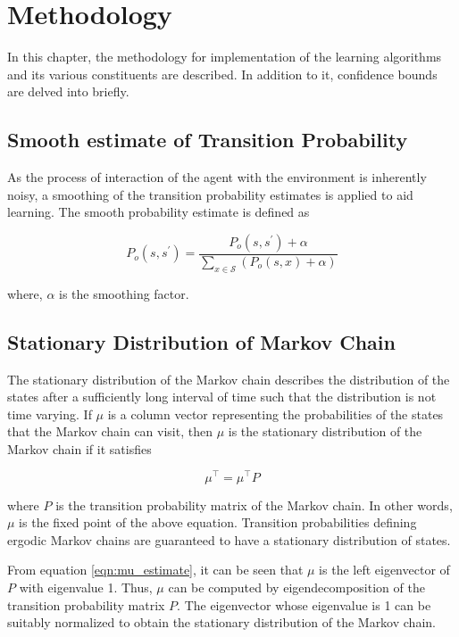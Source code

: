 \chapter{Methodology}

In this chapter, the methodology for implementation of the learning algorithms and its various constituents are described.
In addition to it, confidence bounds are delved into briefly.

\section{Smooth estimate of Transition Probability}

As the process of interaction of the agent with the environment is inherently noisy, a smoothing of the transition probability estimates is applied to aid learning.
The smooth probability estimate is defined as

\begin{equation}
    P_o(s, s^\prime) = \frac{P_o(s, s^\prime) + \alpha}{\sum_{x \in \mathcal{S}} \left(P_o(s, x) + \alpha \right)}
\end{equation}

where, $\alpha$ is the smoothing factor.

\section{Stationary Distribution of Markov Chain}

The stationary distribution of the Markov chain describes the distribution of the states after a sufficiently long interval of time such that the distribution is not time varying.
If $\mu$ is a column vector representing the probabilities of the states that the Markov chain can visit, then $\mu$ is the stationary distribution of the Markov chain if it satisfies 

\begin{equation}
    \label{eqn:mu_estimate}
    \mu^\top = \mu^\top P
\end{equation}


where $P$ is the transition probability matrix of the Markov chain. 
In other words, $\mu$ is the fixed point of the above equation.
Transition probabilities defining ergodic Markov chains are guaranteed to have a stationary distribution of states.

From equation \ref{eqn:mu_estimate}, it can be seen that $\mu$ is the left eigenvector of $P$ with eigenvalue 1.
Thus, $\mu$ can be computed by eigendecomposition of the transition probability matrix $P$. 
The eigenvector whose eigenvalue is 1 can be suitably normalized to obtain the stationary distribution of the Markov chain.


